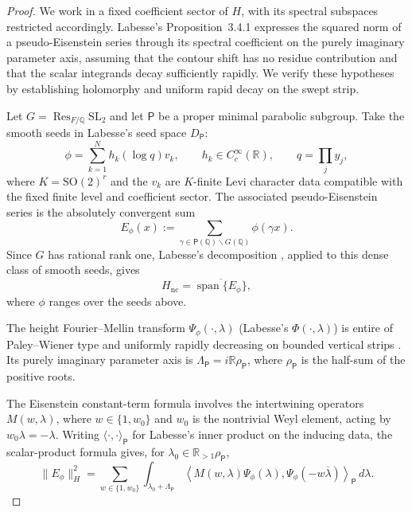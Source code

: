\documentclass[11pt]{article}
\theoremstyle{definition}
\theoremstyle{plain}
\numberwithin{equation}{section}
\newcommand{\nc}{\mathrm{nc}}
\begin{document}
\begin{proof}

We work in a fixed coefficient sector of $H$, with its spectral subspaces
restricted accordingly. Labesse's Proposition~3.4.1 \cite{Labesse} expresses
the squared norm of a pseudo-Eisenstein series through its spectral
coefficient on the purely imaginary parameter axis, assuming that the
contour shift has no residue contribution and that the scalar integrands
decay sufficiently rapidly. We verify these hypotheses by establishing
holomorphy and uniform rapid decay on the swept strip.

Let $G=\operatorname{Res}_{F/\mathbb Q}\mathrm{SL}_2$ and let
$\mathsf P$ be a proper minimal parabolic subgroup. Take the smooth seeds
in Labesse's seed space $D_{\mathsf P}$:
\[
 \phi=\sum_{k=1}^{N}h_k(\log q)v_k,\qquad
 h_k\in C_c^\infty(\mathbb R),\qquad q=\prod_jy_j,
\]
where $K=\mathrm{SO}(2)^r$ and the $v_k$ are $K$-finite Levi character
data compatible with the fixed finite level and coefficient sector.
The associated pseudo-Eisenstein series is the absolutely convergent
sum \cite[\S3.1]{Labesse}
\[
 E_\phi(x):=
 \sum_{\gamma\in\mathsf P(\mathbb Q)\backslash G(\mathbb Q)}
 \phi(\gamma x).
\]
Since $G$ has rational rank one, Labesse's decomposition
\cite[Prop.~3.1.1]{Labesse}, applied to this dense class of smooth seeds,
gives
\begin{equation}\label{eq:two-decompositions}
 H_{\nc}=\overline{\operatorname{span}\{E_\phi\}},
\end{equation}
where $\phi$ ranges over the seeds above.

The height Fourier--Mellin transform $\Psi_\phi(\cdot,\lambda)$ (Labesse's
$\Phi(\cdot,\lambda)$) is entire of Paley--Wiener type and uniformly
rapidly decreasing on bounded vertical strips \cite[\S3.1]{Labesse}.
Its purely imaginary parameter axis is
$\Lambda_{\mathsf P}=i\mathbb R\rho_{\mathsf P}$, where
$\rho_{\mathsf P}$ is the half-sum of the positive roots.

The Eisenstein constant-term formula \cite[\S2.8 and Lem.~2.9.2]{Labesse}
involves the intertwining operators $M(w,\lambda)$, where
$w\in\{1,w_0\}$ and $w_0$ is the nontrivial Weyl element, acting by
$w_0\lambda=-\lambda$.
Writing $\langle\cdot,\cdot\rangle_{\mathsf P}$ for Labesse's inner
product on the inducing data, the scalar-product formula
\cite[Prop.~3.1.2]{Labesse} gives, for
$\lambda_0\in\mathbb R_{>1}\rho_{\mathsf P}$,
\begin{equation}\label{eq:scalar-product-contour}
 \|E_\phi\|_H^2
 =\sum_{w\in\{1,w_0\}}\int_{\lambda_0+\Lambda_{\mathsf P}}
   \left\langle
     M(w,\lambda)\Psi_\phi(\lambda),
     \Psi_\phi(-w\overline\lambda)
   \right\rangle_{\mathsf P}\,d\lambda.
\end{equation}


\end{proof}
\end{document}
